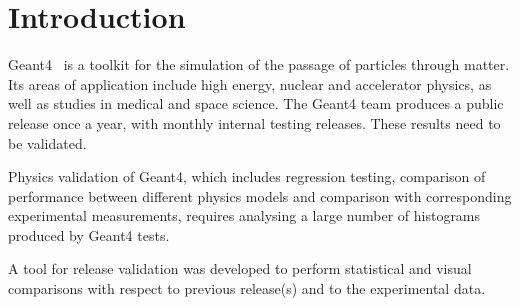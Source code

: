 \section{Introduction}
\label{sec-introduction}
Geant4~\cite{Geant4} is a toolkit for the simulation of the passage of particles through matter. Its areas of application include high energy, nuclear and accelerator physics, as well as studies in medical and space science.
The Geant4 team produces a public release once a year, with monthly internal testing releases. These results need to be validated.

Physics validation of Geant4, which includes regression testing, comparison of performance between different physics models and comparison with corresponding experimental measurements, requires analysing a large number of histograms produced by Geant4 tests. %

A tool for release validation was developed to perform statistical and visual comparisons with respect to previous release(s) and to the experimental data.

